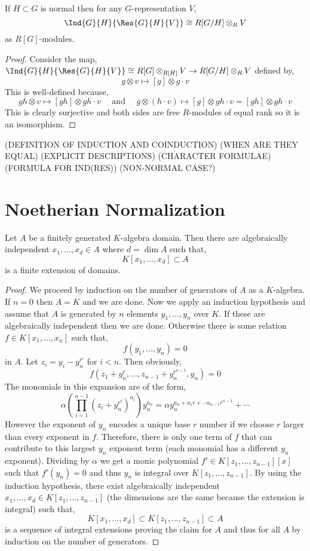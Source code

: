 \documentclass[12pt]{article}
\begin{document}
\begin{prop}
If $H \subset G$ is normal then for any $G$-representation $V$,
\[ \Ind{G}{H}{\Res{G}{H}{V}} \cong R[G/H] \otimes_R V \]
as $R[G]$-modules.
\end{prop}

\begin{proof}
Consider the map, $\Ind{G}{H}{\Res{G}{H}{V}} \cong R[G] \otimes_{R[H]} V \to R[G/H] \otimes_R V$ defined by,
\[ g \otimes v \mapsto [g] \otimes g \cdot v \]
This is well-defined because,
\[ gh \otimes v \mapsto [gh] \otimes gh \cdot v \quad \text{ and } \quad g \otimes (h \cdot v) \mapsto [g] \otimes g h \cdot v = [gh] \otimes gh \cdot v \]
This is clearly surjective and both sides are free $R$-modules of equal rank so it is an isomorphism.
\end{proof}

(DEFINITION OF INDUCTION AND COINDUCTION)
(WHEN ARE THEY EQUAL)
(EXPLICIT DESCRIPTIONS)
(CHARACTER FORMULAE)
(FORMULA FOR IND(RES))
(NON-NORMAL CASE?)

\section{Noetherian Normalization}

\begin{theorem}
Let $A$ be a finitely generated $K$-algebra domain. Then there are algebraically independent $x_1, \dots, x_d \in A$ where $d = \dim{A}$ such that,
\[ K[x_1, \dots, x_d] \subset A \]
is a finite extension of domains.
\end{theorem}

\begin{proof}
We proceed by induction on the number of generators of $A$ as a $K$-algebra. If $n = 0$ then $A = K$ and we are done. Now we apply an induction hypothesis and assume that $A$ is generated by $n$ elements $y_1, \dots, y_n$ over $K$. If these are algebraically independent then we are done. Otherwise there is some relation $f \in K[x_1, \dots, x_n]$ such that,
\[ f(y_1, \dots, y_n) = 0 \]
in $A$. Let $z_i = y_i - y_n^{r^i}$ for $i < n$. Then obviously,
\[ f(z_1 + y_n^r, \dots, z_{n-1} + y_n^{r^{n-1}}, y_n) = 0 \]
The monomials in this expansion are of the form,
\[ \alpha \left( \prod_{i = 1}^{n-1} (z_i + y_n^{r^i})^{a_i} \right) y_n^{a_n} = \alpha y^{a_n + a_1 r + \cdots a_{n-1} r^{n-1}}_n + \cdots \]
However the exponent of $y_n$ encodes a unique base $r$ number if we choose $r$ larger than every exponent in $f$. Therefore, there is only one term of $f$ that can contribute to this largest $y_n$ exponent term (each monomial has a different $y_n$ exponent). Dividing by $\alpha$ we get a monic polynomial $f' \in K[z_1, \dots, z_{n-1}][x]$ such that $f'(y_n) = 0$ and thus $y_n$ is integral over $K[z_1, \dots, z_{n-1}]$. By using the induction hypothesis, there exist algebraically independent $x_1, \dots, x_d \in K[z_1, \dots, z_{n-1}]$ (the dimensions are the same because the extension is integral) such that,
\[ K[x_1, \dots, x_d] \subset K[z_1, \dots, z_{n-1}] \subset A \]
is a sequence of integral extensions proving the claim for $A$ and thus for all $A$ by induction on the number of generators. 
\end{proof}
\end{document}
